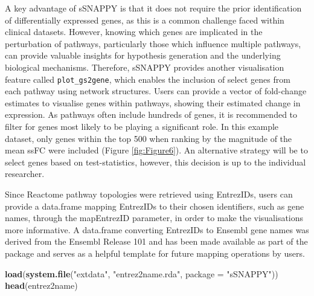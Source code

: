 \documentclass[9pt,a4paper,]{extarticle}
\newenvironment{Shaded}{\begin{snugshade}}{\end{snugshade}}
\newcommand{\AttributeTok}[1]{\textcolor[rgb]{0.13,0.29,0.53}{#1}}
\newcommand{\DecValTok}[1]{\textcolor[rgb]{0.00,0.00,0.81}{#1}}
\newcommand{\FunctionTok}[1]{\textcolor[rgb]{0.13,0.29,0.53}{\textbf{#1}}}
\newcommand{\NormalTok}[1]{#1}
\newcommand{\OtherTok}[1]{\textcolor[rgb]{0.56,0.35,0.01}{#1}}
\newcommand{\SpecialCharTok}[1]{\textcolor[rgb]{0.81,0.36,0.00}{\textbf{#1}}}
\newcommand{\StringTok}[1]{\textcolor[rgb]{0.31,0.60,0.02}{#1}}
\begin{document}
A key advantage of sSNAPPY is that it does not require the prior identification of differentially expressed genes, as this is a common challenge faced within clinical datasets.
However, knowing which genes are implicated in the perturbation of pathways, particularly those which influence multiple pathways, can provide valuable insights for hypothesis generation and the underlying biological mechanisms.
Therefore, sSNAPPY provides another visualisation feature called \texttt{plot\_gs2gene}, which enables the inclusion of select genes from each pathway using network structures.
Users can provide a vector of fold-change estimates to visualise genes within pathways, showing their estimated change in expression.
As pathways often include hundreds of genes, it is recommended to filter for genes most likely to be playing a significant role.
In this example dataset, only genes within the top 500 when ranking by the magnitude of the mean ssFC were included (Figure \ref{fig:Figure6}).
An alternative strategy will be to select genes based on test-statistics, however, this decision is up to the individual researcher.

\begin{Shaded}
\end{Shaded}

Since Reactome pathway topologies were retrieved using EntrezIDs, users can provide a data.frame mapping EntrezIDs to their chosen identifiers, such as gene names, through the mapEntrezID parameter, in order to make the visualisations more informative.
A data.frame converting EntrezIDs to Ensembl gene names was derived from the Ensembl Release 101\citep{Ensembl2022} and has been made available as part of the package and serves as a helpful template for future mapping operations by users.

\begin{Shaded}
\begin{Highlighting}[]
\FunctionTok{load}\NormalTok{(}\FunctionTok{system.file}\NormalTok{(}\StringTok{"extdata"}\NormalTok{, }\StringTok{"entrez2name.rda"}\NormalTok{, }\AttributeTok{package =} \StringTok{"sSNAPPY"}\NormalTok{))}
\FunctionTok{head}\NormalTok{(entrez2name)}
\end{Highlighting}
\end{Shaded}
\end{document}
